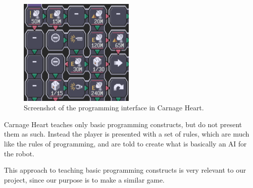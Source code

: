 \begin{figure}[hptb]
  \centering
    \includegraphics[width=0.5\textwidth]{img/CarnageHeartSoftware.png}
  \caption{Screenshot of the programming interface in Carnage Heart.\cite{carnageheartsoftware}}
  \label{fig:carnageheartsoftware}
\end{figure}

Carnage Heart teaches only basic programming constructs, but do not present them as such. Instead the player is presented with a set of rules, which are much like the rules of programming, and are told to create what is basically an AI for the robot.

This approach to teaching basic programming constructs is very relevant to our project, since our purpose is to make a similar game.